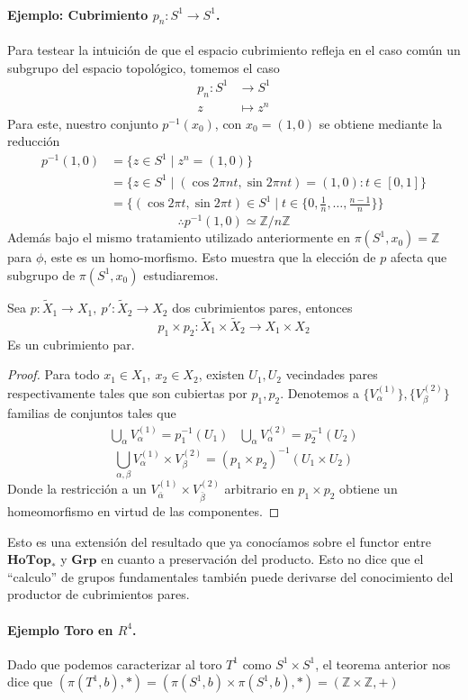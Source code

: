 \paragraph{Ejemplo: Cubrimiento \(p_n : S^1 \to S^1\).} Para testear la intuición
de que el espacio cubrimiento refleja en el caso común un subgrupo del
espacio topológico, tomemos el caso
\begin{align*}
  p_n : S^1 &\longrightarrow S^1 \\
  z &\longmapsto z^n
\end{align*}
Para este, nuestro conjunto \(p^{-1} (x_0)\), con \(x_0 = (1,0)\) se
obtiene mediante la reducción
\begin{align*}
  p^{-1} (1,0)
    &= \{ z \in S^1 \mid z^n = (1,0)\} \\
    &= \{z \in S^1 \mid (\cos 2 \pi n t, \sin 2 \pi n t) = (1,0) :
           t \in [0,1] \} \\
    &= \{(\cos 2 \pi t, \sin 2 \pi t) \in S^1 \mid
           t \in \{0, \frac 1 n , \dotsc , \frac {n-1} n \} \}
\end{align*}
\[ \therefore p^{-1}(1,0) \simeq \mathbb Z / n \mathbb Z \]
Además bajo el mismo tratamiento utilizado anteriormente en \(\pi (S^1,
x_0) = \mathbb Z\) para \(\phi\), este es un homo-morfismo. Esto muestra
que la elección de \(p\) afecta que subgrupo de \(\pi (S^1, x_0)\) estudiaremos.
\begin{teorema}
  Sea \(p : \tilde X _1 \to X_1,\ p' : \tilde X _2 \to X_2 \) dos
  cubrimientos pares, entonces
  \[ p_1 \times p_2 : \tilde X _1 \times \tilde X _2 \to X_1 \times X_2 \]
  Es un cubrimiento par.
\end{teorema}
\begin{proof}
  Para todo \(x_1 \in X_1,\ x_2 \in X_2\), existen \(U_1, U_2\)
  vecindades pares respectivamente tales que son cubiertas por \(p_1,
  p_2\). Denotemos a \(\{V_\alpha^{(1)}\}, \{V_\beta^{(2)}\}\) familias
  de conjuntos tales que
  \[
    \begin{matrix}
      \bigcup_{\alpha} V_\alpha^{(1)} = p_1^{-1} (U_1) &
      \bigcup_{\alpha} V_\alpha^{(2)} = p_2^{-1} (U_2)
    \end{matrix}
  \]
  \[ \bigcup_{\alpha, \beta} V_\alpha^{(1)} \times V_\beta^{(2)} = (p_1
    \times p_2)^{-1} (U_1 \times U_2)\]
  Donde la restricción a un \(V_{\bar{\alpha}}^{(1)} \times
  V_{\bar{\beta}}^{(2)}\) arbitrario en \(p_1 \times p_2\) obtiene un
  homeomorfismo en virtud de las componentes.
\end{proof}

Esto es una extensión del resultado que ya conocíamos sobre el functor
entre \(\mathbf{HoTop}_{*}\) y \(\mathbf{Grp}\) en cuanto a preservación
del producto. Esto no dice que el ``calculo'' de grupos fundamentales
también puede derivarse del conocimiento del productor de cubrimientos
pares.

\paragraph{Ejemplo Toro en \(R^4\).} Dado que podemos caracterizar al
toro \(T^1\) como \(S^1 \times S^1\), el teorema anterior nos dice que
\((\pi (T^1, b), *) = (\pi (S^1, b) \times \pi (S^1, b), *) = (\mathbb Z
\times \mathbb Z, +) \)